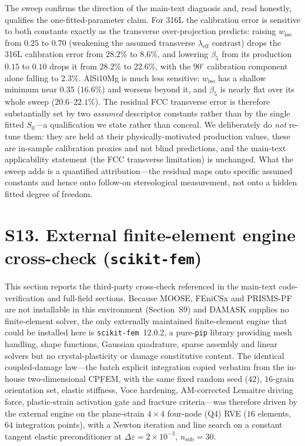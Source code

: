 \documentclass[12pt,a4paper,twocolumn]{article}
\providecommand{\ang}[1]{\ensuremath{#1^{\circ}}}
\begin{document}
The sweep confirms the direction of the main-text diagnosis and, read honestly, qualifies the one-fitted-parameter claim. For 316L the calibration error is sensitive to both constants exactly as the transverse over-projection predicts: raising $w_{\mathrm{iso}}$ from $0.25$ to $0.70$ (weakening the assumed transverse $\lambda_{\mathrm{eff}}$ contrast) drops the 316L calibration error from $28.2\%$ to $8.6\%$, and lowering $\beta_5$ from its production $0.15$ to $0.10$ drops it from $28.2\%$ to $22.6\%$, with the $\ang{90}$ calibration component alone falling to $2.3\%$. AlSi10Mg is much less sensitive: $w_{\mathrm{iso}}$ has a shallow minimum near $0.35$ ($16.6\%$) and worsens beyond it, and $\beta_5$ is nearly flat over its whole sweep ($20.6$--$22.1\%$). The residual FCC transverse error is therefore substantially set by two \emph{assumed} descriptor constants rather than by the single fitted $S_0$---a qualification we state rather than conceal. We deliberately do \emph{not} re-tune them: they are held at their physically-motivated production values, these are in-sample calibration proxies and not blind predictions, and the main-text applicability statement (the FCC transverse limitation) is unchanged. What the sweep adds is a quantified attribution---the residual maps onto specific assumed constants and hence onto follow-on stereological measurement, not onto a hidden fitted degree of freedom.

\section*{S13. External finite-element engine cross-check (\texttt{scikit-fem})}

This section reports the third-party cross-check referenced in the main-text code-verification and
full-field sections. Because MOOSE, FEniCSx and PRISMS-PF are not installable in this environment
(Section~S9) and DAMASK supplies no finite-element solver, the only externally maintained finite-element
engine that could be installed here is \texttt{scikit-fem}~12.0.2, a pure-\texttt{pip} library providing
mesh handling, shape functions, Gaussian quadrature, sparse assembly and linear solvers but no
crystal-plasticity or damage constitutive content. The identical coupled-damage law---the batch explicit
integration copied verbatim from the in-house two-dimensional CPFEM, with the same fixed random seed
($42$), $16$-grain orientation set, elastic stiffness, Voce hardening, AM-corrected Lemaitre driving force,
plastic-strain activation gate and fracture criteria---was therefore driven by the external engine on the
plane-strain $4\times4$ four-node (Q4) RVE ($16$ elements, $64$ integration points), with a Newton
iteration and line search on a constant tangent elastic preconditioner at $\Delta\varepsilon = 2\times10^{-3}$,
$n_{\mathrm{sub}} = 30$.
\end{document}
